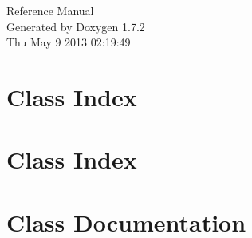 \documentclass[a4paper]{book}
\begin{document}
\hypersetup{pageanchor=false}
\begin{titlepage}
\vspace*{7cm}
\begin{center}
{\Large Reference Manual}\\
\vspace*{1cm}
{\large Generated by Doxygen 1.7.2}\\
\vspace*{0.5cm}
{\small Thu May 9 2013 02:19:49}\\
\end{center}
\end{titlepage}
\clearemptydoublepage
{}
\tableofcontents
\clearemptydoublepage
{}
\hypersetup{pageanchor=true}
\chapter{Class Index}

\chapter{Class Index}

\chapter{Class Documentation}
























\printindex
\end{document}
